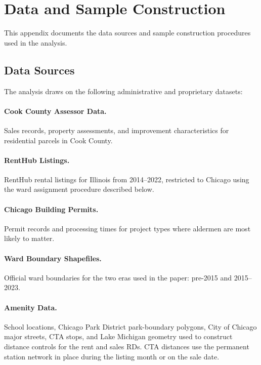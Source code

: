 
\section{Data and Sample Construction}
\label{app:data_sources}
\label{sec:appendix_data}

This appendix documents the data sources and sample construction procedures used in the analysis.

\subsection{Data Sources}

The analysis draws on the following administrative and proprietary datasets:

\paragraph{Cook County Assessor Data.}
Sales records, property assessments, and improvement characteristics for residential parcels in Cook County.

\paragraph{RentHub Listings.}
RentHub rental listings for Illinois from 2014--2022, restricted to Chicago using the ward assignment procedure described below.

\paragraph{Chicago Building Permits.}
Permit records and processing times for project types where aldermen are most likely to matter.

\paragraph{Ward Boundary Shapefiles.}
Official ward boundaries for the two eras used in the paper: pre-2015 and 2015--2023.

\paragraph{Amenity Data.}
School locations, Chicago Park District park-boundary polygons, City of Chicago major streets, CTA stops, and Lake Michigan geometry used to construct distance controls for the rent and sales RDs.
CTA distances use the permanent station network in place during the listing month or on the sale date.

